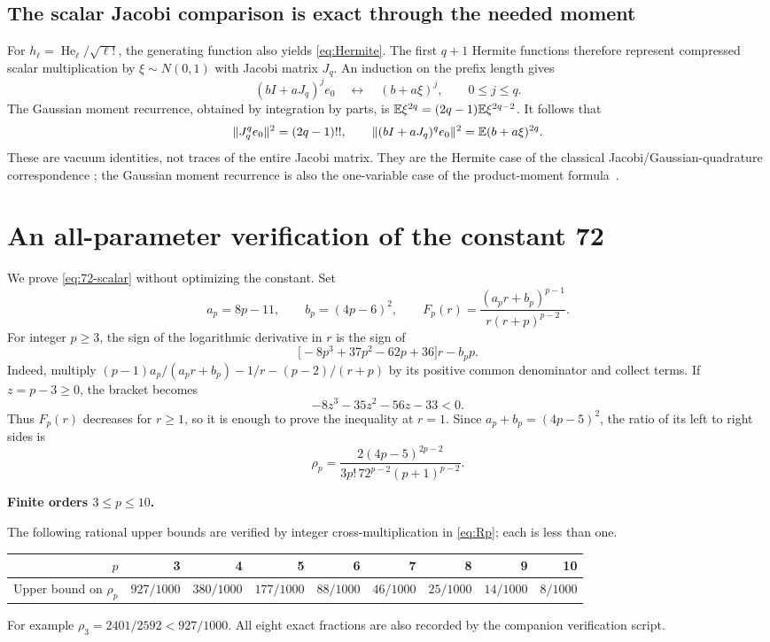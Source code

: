 \documentclass[11pt]{article}
\numberwithin{equation}{section}
\theoremstyle{definition}\newtheorem{definition}[theorem]{Definition}
\theoremstyle{remark}\newtheorem{remark}[theorem]{Remark}
\newcommand{\norm}[1]{\lVert#1\rVert}\newcommand{\ip}[2]{\langle#1,#2\rangle}
\newcommand{\step}[1]{\par\addvspace{.65\baselineskip}\Needspace{4\baselineskip}\noindent\textbf{#1}\par\nobreak\smallskip}
\begin{document}
\subsection{The scalar Jacobi comparison is exact through the needed moment}
For $h_\ell=\operatorname{He}_\ell/\sqrt{\ell!}$, the generating function also
yields \eqref{eq:Hermite}. The first $q+1$ Hermite functions therefore represent
compressed scalar multiplication by $\xi\sim N(0,1)$ with Jacobi matrix $J_q$.
An induction on the prefix length gives
\[
 (bI+aJ_q)^je_0\quad\longleftrightarrow\quad(b+a\xi)^j,
 \qquad 0\le j\le q.
\]
The Gaussian moment recurrence, obtained by integration by parts, is
$\mathbb E\xi^{2q}=(2q-1)\mathbb E\xi^{2q-2}$. It follows that
\[
 \norm{J_q^qe_0}^2=(2q-1)!!,\qquad
 \norm{(bI+aJ_q)^qe_0}^2=\E(b+a\xi)^{2q}.
\]
These are vacuum identities, not traces of the entire Jacobi matrix. They are
the Hermite case of the classical Jacobi/Gaussian-quadrature correspondence
\cite{GolubWelsch}; the Gaussian moment recurrence is also the one-variable case
of the product-moment formula~\cite{Isserlis}.

\section{An all-parameter verification of the constant 72}\label{app:72}
We prove \eqref{eq:72-scalar} without optimizing the constant. Set
\[
 a_p=8p-11,\qquad b_p=(4p-6)^2,\qquad
 F_p(r)=\frac{(a_pr+b_p)^{p-1}}{r(r+p)^{p-2}}.
\]
For integer $p\ge3$, the sign of the logarithmic derivative in $r$ is the sign of
\[
 \bigl[-8p^3+37p^2-62p+36\bigr]r-b_pp.
\]
Indeed, multiply $(p-1)a_p/(a_pr+b_p)-1/r-(p-2)/(r+p)$ by its positive
common denominator and collect terms. If $z=p-3\ge0$, the bracket becomes
\[
 -8z^3-35z^2-56z-33<0.
\]
Thus $F_p(r)$ decreases for $r\ge1$, so it is enough to prove the inequality at
$r=1$. Since $a_p+b_p=(4p-5)^2$, the ratio of its left to right sides is
\begin{equation}\label{eq:Rp}
 \rho_p=\frac{2(4p-5)^{2p-2}}
 {3p!\,72^{p-2}(p+1)^{p-2}}.
\end{equation}

\step{Finite orders $3\le p\le10$.}
The following rational upper bounds are verified by integer cross-multiplication
in \eqref{eq:Rp}; each is less than one.
\begin{center}
\footnotesize\renewcommand{\arraystretch}{1.25}\setlength{\tabcolsep}{5pt}
\begin{tabular}{@{}rrrrrrrrr@{}}
\toprule
$p$&3&4&5&6&7&8&9&10\\
\midrule
Upper bound on $\rho_p$&$927/1000$&$380/1000$&$177/1000$&$88/1000$&$46/1000$&$25/1000$&$14/1000$&$8/1000$\\
\bottomrule
\end{tabular}
\end{center}
For example $\rho_3=2401/2592<927/1000$.
All eight exact fractions are also recorded by the companion verification script.
\end{document}
